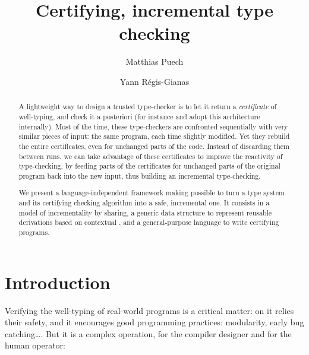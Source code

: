 \documentclass{llncs}
\begin{document}
\title{Certifying, incremental type checking}

\author{Matthias Puech \and Yann R\'egis-Gianas}

\maketitle

\begin{abstract}

  A lightweight way to design a trusted type-checker is to let it
  return a \emph{certificate} of well-typing, and check it a
  posteriori (for instance  and  adopt this
  architecture internally).  Most of the time, these type-checkers are
  confronted sequentially with very similar pieces of input: the same
  program, each time slightly modified. Yet they rebuild the entire
  certificates, even for unchanged parts of the code. Instead of
  discarding them between runs, we can take advantage of these
  certificates to improve the reactivity of type-checking, by feeding
  parts of the certificates for unchanged parts of the original
  program back into the new input, thus building an incremental
  type-checking.

  We present a language-independent framework making possible to turn
  a type system and its certifying checking algorithm into a safe,
  incremental one. It consists in a model of incrementality by
  sharing, a generic data structure to represent reusable derivations
  based on contextual \LF, and a general-purpose language to write
  certifying programs.
\end{abstract}


\section*{Introduction}


Verifying the well-typing of real-world programs is a critical matter:
on it relies their safety, and it encourages good programming
practices: modularity, early bug catching\ldots. But it is a complex
operation, for the compiler designer and for the human operator:
\end{document}
